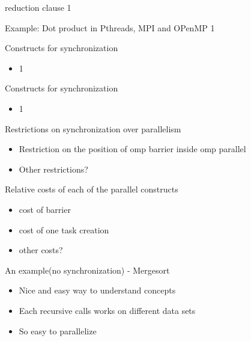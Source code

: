 \documentclass[14pt]{beamer}
\begin{document}
\begin{frame}[fragile]{reduction clause}
1
\end{frame}

\begin{frame}[fragile]{Example: Dot product in Pthreads, MPI and OPenMP}
1
\end{frame}

\begin{frame}{Constructs for synchronization}
\begin{itemize}
\item 1
\end{itemize}
\end{frame}

\begin{frame}{Constructs for synchronization}
\begin{itemize}
\item 1
\end{itemize}
\end{frame}

\begin{frame}{Restrictions on synchronization over parallelism}
\begin{itemize}
\item Restriction on the position of omp barrier inside omp parallel
\item Other restrictions?
\end{itemize}
\end{frame}

\begin{frame}{Relative costs of each of the parallel constructs}
\begin{itemize}
\item cost of barrier
\item cost of one task creation
\item other costs?
\end{itemize}
\end{frame}

\begin{frame}{An example(no synchronization) - Mergesort}
\begin{itemize}
\item Nice and easy way to understand concepts
\item Each recursive calls works on different data sets
\item So easy to parallelize
\end{itemize}
\end{frame}
\end{document}
